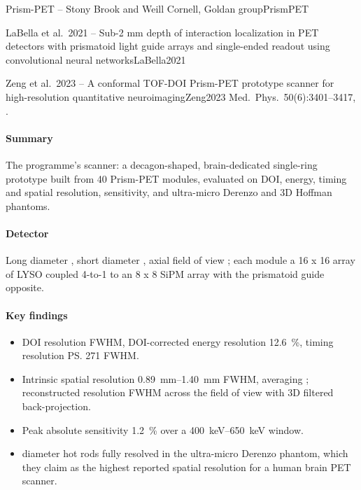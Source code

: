 \begin{programnote}{Prism-PET -- Stony Brook and Weill Cornell, Goldan group}{PrismPET}
\begin{papernote}{LaBella et al.\ 2021 -- Sub-2 mm depth of interaction localization in PET detectors with prismatoid light guide arrays and single-ended readout using convolutional neural networks}{LaBella2021}
\end{papernote}

\begin{papernote}{Zeng et al.\ 2023 -- A conformal TOF-DOI Prism-PET prototype scanner for high-resolution quantitative neuroimaging}{Zeng2023}
Med.\ Phys.\ 50(6):3401--3417, .

\paragraph{Summary}
The programme's scanner: a decagon-shaped, brain-dedicated single-ring
prototype built from 40 Prism-PET modules, evaluated on DOI, energy, timing and
spatial resolution, sensitivity, and ultra-micro Derenzo and 3D Hoffman
phantoms.

\paragraph{Detector}
Long diameter , short diameter , axial field of view
; each module a 16 x 16 array of
 LYSO coupled 4-to-1 to an 8 x 8 SiPM
array with the prismatoid guide opposite.

\paragraph{Key findings}
\begin{itemize}
	\item DOI resolution  FWHM, DOI-corrected energy resolution
		\qty{12.6}{\percent}, timing resolution \ps{271} FWHM.
	\item Intrinsic spatial resolution \qtyrange{0.89}{1.40}{\milli\metre} FWHM,
		averaging ; reconstructed resolution  FWHM across the
		field of view with 3D filtered back-projection.
	\item Peak absolute sensitivity \qty{1.2}{\percent} over a
		\qtyrange{400}{650}{\kilo\electronvolt} window.
	\item {} diameter hot rods fully resolved in the ultra-micro Derenzo
		phantom, which they claim as the highest reported spatial resolution for
		a human brain PET scanner.
\end{itemize}


\end{papernote}
\end{programnote}
